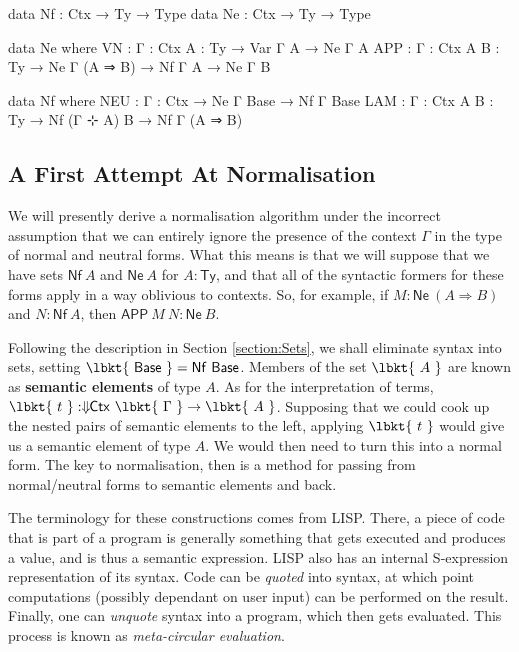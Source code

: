 \begin{code}
data Nf : Ctx → Ty → Type
data Ne : Ctx → Ty → Type

data Ne where
  VN : {Γ : Ctx} {A : Ty} → Var Γ A → Ne Γ A
  APP : {Γ : Ctx} {A B : Ty} → Ne Γ (A ⇒ B) → Nf Γ A → Ne Γ B

data Nf where
  NEU : {Γ : Ctx} → Ne Γ Base → Nf Γ Base
  LAM : {Γ : Ctx} {A B : Ty} → Nf (Γ ⊹ A) B → Nf Γ (A ⇒ B)
\end{code}

\subsection{A First Attempt At Normalisation}

We will presently derive a normalisation algorithm under the incorrect
assumption that we can entirely ignore the presence of the context $\Gamma$ in
the type of normal and neutral forms. What this means is that we will suppose
that we have sets $\mathsf{Nf}~A$ and $\mathsf{Ne}~A$ for $A : \mathsf{Ty}$,
and that all of the syntactic formers for these forms apply in a way oblivious
to contexts. So, for example, if $M : \mathsf{Ne}~(A \Rightarrow B)$ and $N :
\mathsf{Nf}~A$, then $\mathsf{APP}~M~N : \mathsf{Ne}~B$.

Following the description in Section \ref{section:Sets}, we shall eliminate
syntax into sets, setting $\lbkt{~\mathsf{Base}~} = \mathsf{Nf}~\mathsf{Base}$.
Members of the set $\lbkt{~A~}$ are known as \textbf{semantic elements} of type
$A$. As for the interpretation of terms, $\lbkt{~t~} : \Downarrow\!\!
\mathsf{Ctx}~ \lbkt{~\Gamma~} \to \lbkt{~A~}$. Supposing that we could cook up
the nested pairs of semantic elements to the left, applying $\lbkt{~t~}$ would
give us a semantic element of type $A$. We would then need to turn this into
a normal form. The key to normalisation, then is a method for passing from
normal/neutral forms to semantic elements and back.

The terminology for these constructions comes from LISP. There, a piece of code
that is part of a program is generally something that gets executed and produces
a value, and is thus a semantic expression. LISP also has an internal
S-expression representation of its syntax. Code can be \emph{quoted} into
syntax, at which point computations (possibly dependant on user input) can be
performed on the result. Finally, one can \emph{unquote} syntax into a program,
which then gets evaluated. This process is known as \emph{meta-circular
evaluation}.

